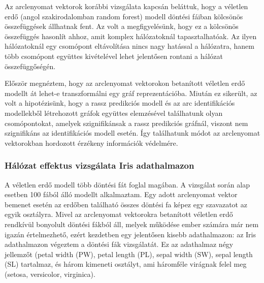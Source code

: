 Az arclenyomat vektorok korábbi vizsgálata kapcsán beláttuk, hogy a véletlen erdő (angol szakirodalomban random forest) modell döntési fáiban kölcsönös összefüggések állhatnak fent. Az volt a megfigyelésünk, hogy ez a kölcsönös összefüggés hasonlít ahhoz, amit komplex hálózatoknál tapasztalhatóak. Az ilyen hálózatoknál egy csomópont eltávolítása nincs nagy hatással a hálózatra, hanem több csomópont együttes kivételével lehet jelentősen rontani a hálózat összefüggőségén. 

Először megnéztem, hogy az arclenyomat vektorokon betanított véletlen erdő modellt át lehet-e transzformálni egy gráf reprezentációba. Miután ez sikerült, az volt a hipotézisünk, hogy a rassz predikciós modell és az arc identifikációs modellekből létrehozott gráfok együttes elemzésével találhatunk olyan csomópontokat, amelyek szignifikánsak a rassz predikciós gráfnál, viszont nem szignifikáns az identifikációs modell esetén. Így találhatunk módot az arclenyomat vektorokban hordozott érzékeny információk védelmére. 

\subsubsection*{Hálózat effektus vizsgálata Iris adathalmazon}
A véletlen erdő modell több döntési fát foglal magában. A vizsgálat során alap esetben 100 fából álló modellt alkalmaztam. Egy adott arclenyomat vektor bemenet esetén az erdőben található összes döntési fa képez egy szavazatot az egyik osztályra. Mivel az arclenyomat vektorokra betanított véletlen erdő rendkívül bonyolult döntési fákból áll, melyek működése ember számára már nem igazán értelmezhető, ezért kezdetben egy jelentősen kisebb adathalmazon: az Iris adathalmazon \cite{iris1936} végeztem a döntési fák vizsgálatát. Ez az adathalmaz négy jellemzőt (petal width (PW), petal length (PL), sepal width (SW), sepal length (SL) tartalmaz, és három kimeneti osztályt, ami háromféle virágnak felel meg (setosa, versicolor, virginica). 

